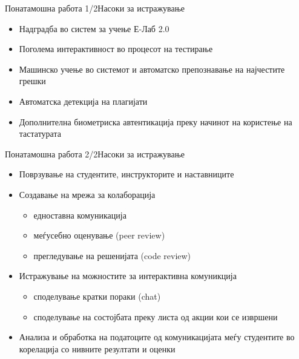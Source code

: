 \begin{frame}{Понатамошна работа 1/2}{Насоки за истражување}
\begin{itemize}[<+-| alert@+>]
  \item Надградба во систем за учење Е-Лаб 2.0
  \item Поголема интерактивност во процесот на тестирање
  \item Машинско учење во системот и автоматско препознавање на најчестите
  грешки
  \item Автоматска детекција на плагијати
  \item Дополнителна биометриска автентикација преку начинот на користење на
  тастатурата
\end{itemize}
\end{frame}

\begin{frame}{Понатамошна работа 2/2}{Насоки за истражување}
\begin{itemize}[<+-| alert@+>]
  \item Поврзување на студентите, инструкторите и наставниците
  \item Создавање на мрежа за колаборација 
  \begin{itemize}
  \item едноставна комуникација
  \item меѓусебно оценување (peer review)
  \item прегледување на решенијата (code review)
  \end{itemize}
  \item Истражување на можностите за интерактивна комуникција
  \begin{itemize}
  \item споделување кратки пораки (chat)
  \item споделување на состојбата преку листа од акции кои се извршени
  \end{itemize}
  \item Анализа и обработка на податоците од комуникацијата меѓу студентите во
  корелација со нивните резултати и оценки
\end{itemize}
\end{frame}

